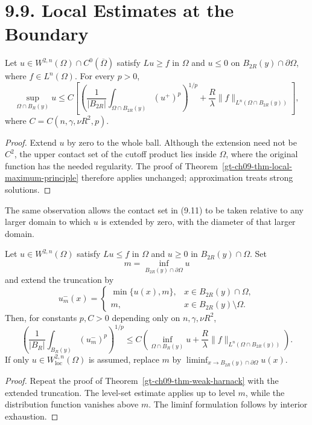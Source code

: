 \section*{9.9. Local Estimates at the Boundary}

\begin{theorem}
\label{gt-ch09-thm-boundary-local-maximum}
Let $u\in W^{2,n}(\Omega)\cap C^0(\overline\Omega)$ satisfy $Lu\ge f$ in
$\Omega$ and $u\le0$ on $B_{2R}(y)\cap\partial\Omega$, where
$f\in L^n(\Omega)$.  For every $p>0$,
\begin{equation}\tag{9.64}
\sup_{\Omega\cap B_R(y)}u\le C\left[
\left(\frac1{|B_{2R}|}\int_{\Omega\cap B_{2R}(y)}(u^+)^p\right)^{1/p}
+\frac R\lambda\|f\|_{L^n(\Omega\cap B_{2R}(y))}\right],
\end{equation}
where $C=C(n,\gamma,\nu R^2,p)$.
\end{theorem}
\begin{proof}
\sketch Extend $u$ by zero to the whole ball.  Although the extension need
not be $C^2$, the upper contact set of the cutoff product lies inside
$\Omega$, where the original function has the needed regularity.  The proof
of Theorem~\ref{gt-ch09-thm-local-maximum-principle} therefore applies
unchanged; approximation treats strong solutions.
\end{proof}

The same observation allows the contact set in (9.11) to be taken relative to
any larger domain to which $u$ is extended by zero, with the diameter of that
larger domain.

\begin{theorem}
\label{gt-ch09-thm-boundary-weak-harnack}
Let $u\in W^{2,n}(\Omega)$ satisfy $Lu\le f$ in $\Omega$ and $u\ge0$ in
$B_{2R}(y)\cap\Omega$.  Set
\[
m=\inf_{B_{2R}(y)\cap\partial\Omega}u
\]
and extend the truncation by
\[
u_m^-(x)=
\begin{cases}
\min\{u(x),m\},&x\in B_{2R}(y)\cap\Omega,\\
m,&x\in B_{2R}(y)\setminus\Omega.
\end{cases}
\]
Then, for constants $p,C>0$ depending only on $n,\gamma,\nu R^2$,
\begin{equation}\tag{9.65}
\left(\frac1{|B_R|}\int_{B_R(y)}(u_m^-)^p\right)^{1/p}
\le C\left(\inf_{\Omega\cap B_R(y)}u+
\frac R\lambda\|f\|_{L^n(\Omega\cap B_{2R}(y))}\right).
\end{equation}
If only $u\in W^{2,n}_{\mathrm{loc}}(\Omega)$ is assumed, replace $m$ by
$\liminf_{x\to B_{2R}(y)\cap\partial\Omega}u(x)$.
\end{theorem}
\begin{proof}
\sketch Repeat the proof of Theorem~\ref{gt-ch09-thm-weak-harnack} with the
extended truncation.  The level-set estimate applies up to level $m$, while
the distribution function vanishes above $m$.  The liminf formulation
follows by interior exhaustion.
\end{proof}

